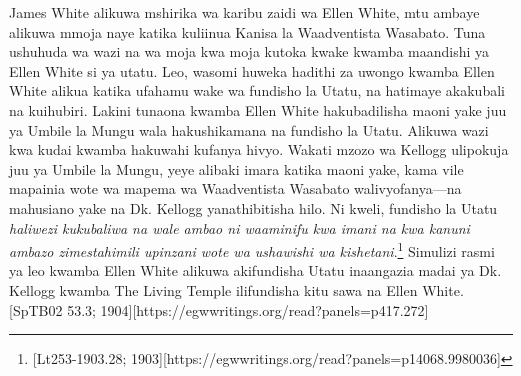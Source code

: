 James White alikuwa mshirika wa karibu zaidi wa Ellen White, mtu ambaye alikuwa mmoja naye katika kuliinua Kanisa la Waadventista Wasabato. Tuna ushuhuda wa wazi na wa moja kwa moja kutoka kwake kwamba maandishi ya Ellen White si ya utatu. Leo, wasomi huweka hadithi za uwongo kwamba Ellen White alikua katika ufahamu wake wa fundisho la Utatu, na hatimaye akakubali na kuihubiri. Lakini tunaona kwamba Ellen White hakubadilisha maoni yake juu ya Umbile la Mungu wala hakushikamana na fundisho la Utatu. Alikuwa wazi kwa kudai kwamba hakuwahi kufanya hivyo. Wakati mzozo wa Kellogg ulipokuja juu ya Umbile la Mungu, yeye alibaki imara katika maoni yake, kama vile mapainia wote wa mapema wa Waadventista Wasabato walivyofanya—na mahusiano yake na Dk. Kellogg yanathibitisha hilo. Ni kweli, fundisho la Utatu \textit{haliwezi kukubaliwa na wale ambao ni waaminifu kwa imani na kwa kanuni ambazo zimestahimili upinzani wote wa ushawishi wa kishetani}.\footnote{[Lt253-1903.28; 1903][https://egwwritings.org/read?panels=p14068.9980036]} Simulizi rasmi ya leo kwamba Ellen White alikuwa akifundisha Utatu inaangazia madai ya Dk. Kellogg kwamba The Living Temple ilifundisha kitu sawa na Ellen White. [SpTB02 53.3; 1904][https://egwwritings.org/read?panels=p417.272]


